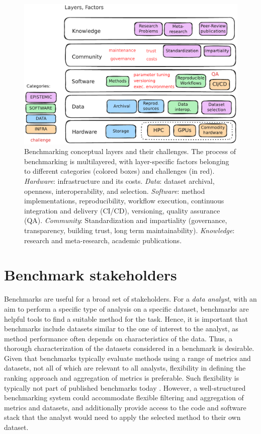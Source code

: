 \documentclass[11pt]{article}
\begin{document}
\begin{figure}
    \centering
    \includegraphics[width=0.8\linewidth]{./figures/fig2_bens_layers.pdf}
    \caption[Benchmarking conceptual layers and their challenges.]{Benchmarking conceptual layers and their challenges. The process of benchmarking is multilayered, with layer-specific factors belonging to different categories (colored boxes) and challenges (in red). \emph{Hardware}: infrastructure and its costs. \emph{Data}: dataset archival, openness, interoperability, and selection.  \emph{Software}: method implementations, reproducibility, workflow execution, continuous integration and delivery (CI/CD), versioning, quality assurance (QA). \emph{Community}: Standardization and impartiality (governance, transparency, building trust, long term maintainability). \emph{Knowledge}: research and meta-research, academic publications.}
    \label{fig:layers}
\end{figure}

\section*{Benchmark stakeholders}

Benchmarks are useful for a broad set of stakeholders. For a \emph{data analyst}, with an aim to perform a specific type of analysis on a specific dataset, benchmarks are helpful tools to find a suitable method for the task. Hence, it is important that benchmarks include datasets similar to the one of interest to the analyst, as method performance often depends on characteristics of the data. Thus, a thorough characterization of the datasets considered in a benchmark is desirable. Given that benchmarks typically evaluate methods using a range of metrics and datasets, not all of which are relevant to all analysts, flexibility in defining the ranking approach and aggregation of metrics is preferable. Such flexibility is typically not part of published benchmarks today \cite{Sonrel2023-te}. However, a well-structured benchmarking system could accommodate flexible filtering and aggregation of metrics and datasets, and additionally provide access to the code and software stack that the analyst would need to apply the selected method to their own dataset. 
\end{document}
